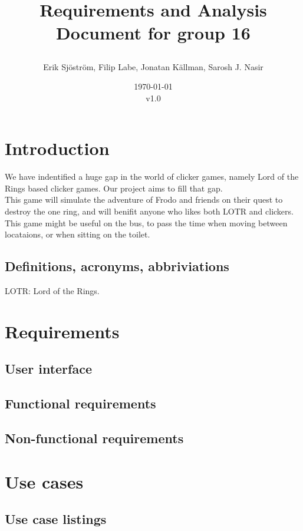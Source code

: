 \documentclass{article}
\title{
    Requirements and Analysis Document for group 16
    \author{Erik Sjöström,
            Filip Labe,
            Jonatan Källman,
            Sarosh J. Nasir}
    \date{\today \\v1.0}         
}
\begin{document}
\maketitle

\section{Introduction}
We have indentified a huge gap in the world of clicker games, namely 
Lord of the Rings based clicker games. Our project aims to fill that gap. \\
This game will simulate the adventure of Frodo and friends on their quest to
destroy the one ring, and will benifit anyone who likes both LOTR and clickers.\\
This game might be useful on the bus, to pass the time when moving between locataions, or when sitting on the toilet. 

\subsection{Definitions, acronyms, abbriviations}
LOTR: Lord of the Rings.

\section{Requirements}
\subsection{User interface}
\subsection{Functional requirements}
\subsection{Non-functional requirements}

\section{Use cases}
\subsection{Use case listings}
\end{document}
